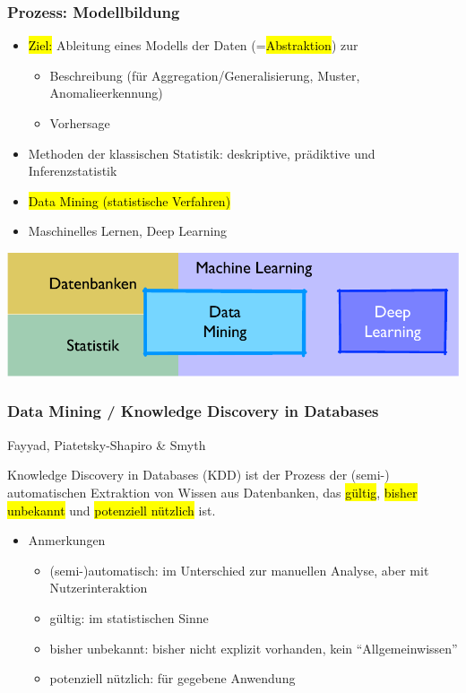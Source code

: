 \begin{frame}
  \frametitle{Prozess: Modellbildung}

  \begin{itemize}
    \item \hl{Ziel:} Ableitung eines Modells der Daten (=\hl{Abstraktion}) zur
    \begin{itemize}
      \item Beschreibung (für Aggregation/Generalisierung, Muster, Anomalieerkennung)
      \item Vorhersage
    \end{itemize}
        \item Methoden der klassischen Statistik: deskriptive, prädiktive und Inferenzstatistik
        \item \hl{Data Mining (statistische Verfahren)}
        \item Maschinelles Lernen, Deep Learning
      \end{itemize}

      \begin{center}
        \includegraphics[scale=.6]{fig1/dm-vs-ml.pdf}
        \end{center}

\end{frame}

\begin{frame}
  \frametitle{Data Mining / Knowledge Discovery in Databases}

  Fayyad, Piatetsky-Shapiro \& Smyth
  \begin{notebox}
  Knowledge Discovery in Databases (KDD) ist der Prozess der (semi-)
  automatischen Extraktion von Wissen aus Datenbanken, das
  \hl{gültig}, \hl{bisher unbekannt} und \hl{potenziell nützlich} ist.
  \end{notebox}

  \begin{itemize}
  \item Anmerkungen
  \begin{itemize}
  \item (semi-)automatisch: im Unterschied zur manuellen Analyse, aber
    mit Nutzerinteraktion
  \item gültig: im statistischen Sinne
  \item bisher unbekannt: bisher nicht explizit vorhanden, kein
    "`Allgemeinwissen"'
  \item potenziell nützlich: für gegebene Anwendung
  \end{itemize}
  \end{itemize}

  \end{frame}



